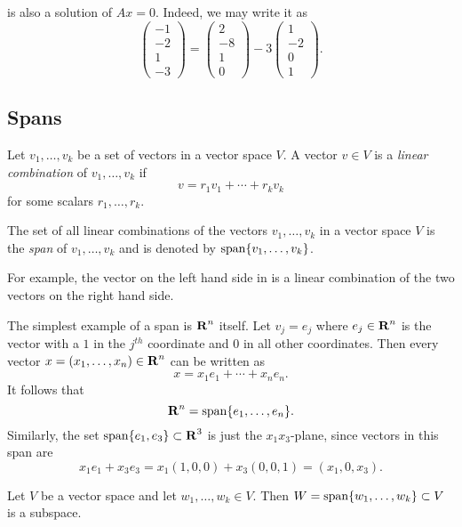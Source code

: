 \documentclass{ximera}
\begin{document}
is also a solution of $Ax=0$.  Indeed, we may write it as
\begin{equation}
\label{eq:SpanSol}
\left(\begin{array}{r} -1 \\ -2\\ 1\\ -3 \end{array}\right)
=
\left(\begin{array}{r} 2 \\ -8\\ 1\\ 0 \end{array}\right) -
3 \left(\begin{array}{r} 1 \\ -2\\ 0\\ 1 \end{array}\right).
\end{equation}


\subsection*{Spans}

Let $v_1,\ldots,v_k$ be a set of vectors in a vector space $V$.  A vector
$v\in V$ is a {\em linear combination\/} of $v_1,\ldots,v_k$
if
\[
v = r_1v_1 + \cdots + r_kv_k
\]
for some scalars $r_1,\ldots,r_k$.  


\begin{Def}  \label{span}
The set of all linear combinations of the vectors $v_1,\ldots,v_k$
in a vector space $V$ is the {\em span\/} of $v_1,\ldots,v_k$ and is
denoted by ${\rm span}\{v_1,\ldots,v_k\}$.
\end{Def} 

For example, the vector on the left hand side in 
is a linear combination of the two vectors on the right hand side.

The simplest example of a span is $\mbox{$\bf{R}$}^n$ itself.  Let $v_j=e_j$
where $e_j\in\mbox{$\bf{R}$}^n$ is the vector with a $1$ in the $j^{th}$
coordinate and $0$ in all other coordinates.  Then every vector
$x=(x_1,\ldots,x_n)\in\mbox{$\bf{R}$}^n$ can be written as
\[
x = x_1e_1 + \cdots + x_ne_n.
\]
It follows that
\[
\mbox{$\bf{R}$}^n={\rm span}\{e_1,\ldots,e_n\}.
\]
Similarly, the set ${\rm span}\{e_1,e_3\}\subset\mbox{$\bf{R}$}^3$ is just the
$x_1x_3$-plane, since vectors in this span are
\[
x_1e_1+x_3e_3 = x_1(1,0,0) + x_3(0,0,1) = (x_1,0,x_3).
\]

\begin{prop} \label{spansubspace} Let $V$ be a vector space and
let $w_1,\ldots,w_k\in V$. Then $W={\rm span}\{w_1,\ldots,w_k\}
\subset V$ is a subspace.
\end{prop}  
\end{document}
